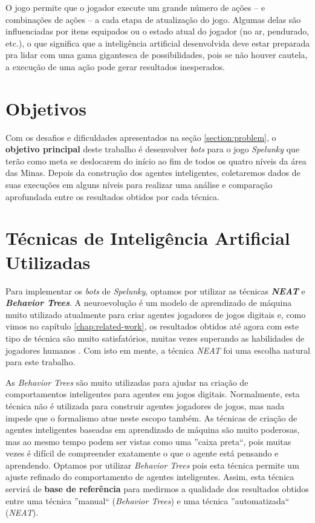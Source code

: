 O jogo permite que o jogador execute um grande número de ações -- e combinações
de ações -- a cada etapa de atualização do jogo. Algumas delas são influenciadas
por itens equipados ou o estado atual do jogador (no ar, pendurado, etc.), o que
significa que a inteligência artificial desenvolvida deve estar preparada pra
lidar com uma gama gigantesca de possibilidades, pois se não houver cautela, a
execução de uma ação pode gerar resultados inesperados.


\section{\label{section:objectives}Objetivos}
Com os desafios e dificuldades apresentados na seção \ref{section:problem}, o
\textbf{objetivo principal} deste trabalho é desenvolver \textit{bots} para o
jogo \textit{Spelunky} que terão como meta se deslocarem do início ao fim de
todos os quatro níveis da área das Minas. Depois da construção dos agentes
inteligentes, coletaremos dados de suas execuções em alguns níveis para realizar
uma análise e comparação aprofundada entre os resultados obtidos por cada
técnica.


\section{\label{section:techniques}Técnicas de Inteligência Artificial
Utilizadas}
Para implementar os \textit{bots} de \textit{Spelunky}, optamos por utilizar as
técnicas \textbf{\textit{NEAT}} e \textbf{\textit{Behavior Trees}}. A
neuroevolução é um modelo de aprendizado de máquina muito utilizado atualmente
para criar agentes jogadores de jogos digitais \cite{DBLP:journals/corr/RisiT14}
e, como vimos no capítulo \ref{chap:related-work}, os resultados obtidos até
agora com este tipo de técnica são muito satisfatórios, muitas vezes superando
as habilidades de jogadores humanos \cite{NeuroEvolutionAtari}. Com isto em
mente, a técnica \textit{NEAT} foi uma escolha natural para este trabalho.

As \textit{Behavior Trees} são muito utilizadas para ajudar na criação de
comportamentos inteligentes para agentes em jogos digitais. Normalmente, esta
técnica não é utilizada para construir agentes jogadores de jogos, mas nada
impede que o formalismo atue neste escopo também. As técnicas de criação de
agentes inteligentes baseadas em aprendizado de máquina são muito poderosas, mas
ao mesmo tempo podem ser vistas como uma ''caixa preta``, pois muitas vezes é
difícil de compreender exatamente o que o agente está pensando e aprendendo.
Optamos por utilizar \textit{Behavior Trees} pois esta técnica permite um ajuste
refinado do comportamento de agentes inteligentes. Assim, esta técnica servirá
de \textbf{base de referência} para medirmos a qualidade dos resultados obtidos
entre uma técnica ''manual`` (\textit{Behavior Trees}) e uma técnica
''automatizada`` (\textit{NEAT}).


